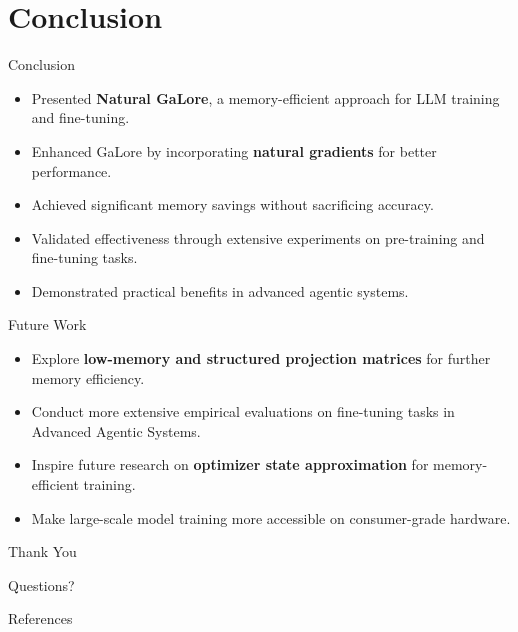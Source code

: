 \documentclass{beamer}
\begin{document}
\section{Conclusion}

\begin{frame}{Conclusion}
    \begin{itemize}
        \item Presented \textbf{Natural GaLore}, a memory-efficient approach for LLM training and fine-tuning.
        \item Enhanced GaLore by incorporating \textbf{natural gradients} for better performance.
        \item Achieved significant memory savings without sacrificing accuracy.
        \item Validated effectiveness through extensive experiments on pre-training and fine-tuning tasks.
        \item Demonstrated practical benefits in advanced agentic systems.
    \end{itemize}
\end{frame}

\begin{frame}{Future Work}
    \begin{itemize}
        \item Explore \textbf{low-memory and structured projection matrices} for further memory efficiency.
        \item Conduct more extensive empirical evaluations on fine-tuning tasks in Advanced Agentic Systems.
        \item Inspire future research on \textbf{optimizer state approximation} for memory-efficient training.
        \item Make large-scale model training more accessible on consumer-grade hardware.
    \end{itemize}
\end{frame}

\begin{frame}{Thank You}
    \begin{center}
        Questions?
    \end{center}
\end{frame}

\begin{frame}[allowframebreaks]{References}
    \small
    
    
\end{frame}
\end{document}
